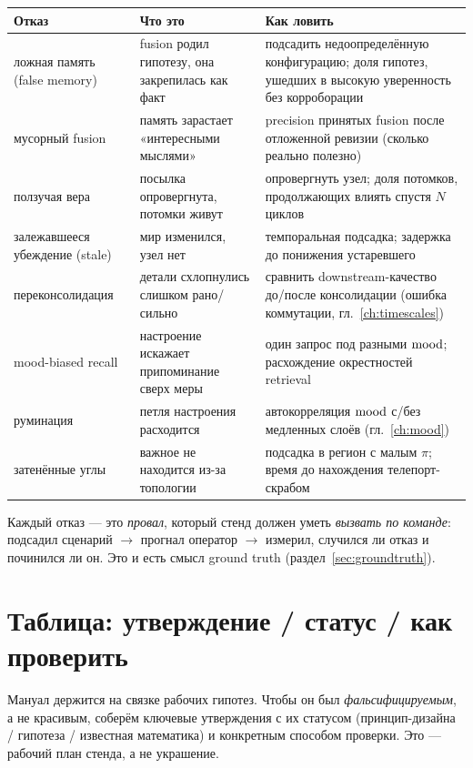 \begin{center}
\begin{tabular}{p{} p{} p{}}
\toprule
\textbf{Отказ} & \textbf{Что это} & \textbf{Как ловить} \\
\midrule
ложная память (false memory) & fusion родил гипотезу, она закрепилась как факт & подсадить недоопределённую конфигурацию; доля гипотез, ушедших в высокую уверенность без корроборации \\
мусорный fusion & память зарастает «интересными мыслями» & precision принятых fusion после отложенной ревизии (сколько реально полезно) \\
ползучая вера & посылка опровергнута, потомки живут & опровергнуть узел; доля потомков, продолжающих влиять спустя $N$ циклов \\
залежавшееся убеждение (stale) & мир изменился, узел нет & темпоральная подсадка; задержка до понижения устаревшего \\
переконсолидация & детали схлопнулись слишком рано/сильно & сравнить downstream-качество до/после консолидации (ошибка коммутации, гл.~\ref{ch:timescales}) \\
mood-biased recall & настроение искажает припоминание сверх меры & один запрос под разными $\mathrm{mood}$; расхождение окрестностей retrieval \\
руминация & петля настроения расходится & автокорреляция $\mathrm{mood}$ с/без медленных слоёв (гл.~\ref{ch:mood}) \\
затенённые углы & важное не находится из-за топологии & подсадка в регион с малым $\pi$; время до нахождения телепорт-скрабом \\
\bottomrule
\end{tabular}
\end{center}

Каждый отказ — это \emph{провал}, который стенд должен уметь \emph{вызвать по
команде}: подсадил сценарий $\to$ прогнал оператор $\to$ измерил, случился ли отказ и
починился ли он. Это и есть смысл ground truth (раздел~\ref{sec:groundtruth}).

\section{Таблица: утверждение / статус / как проверить}
\label{sec:claimtable}

Мануал держится на связке рабочих гипотез. Чтобы он был \emph{фальсифицируемым}, а не
красивым, соберём ключевые утверждения с их статусом (принцип-дизайна /
гипотеза / известная математика) и конкретным способом проверки. Это — рабочий
план стенда, а не украшение.

